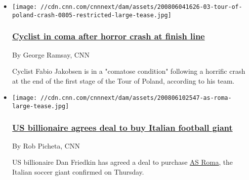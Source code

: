 \begin{itemize}
\item
  \href{/2020/08/06/sport/fabio-jakobsen-tour-of-poland-crash-cycling-spt-intl/index.html}{}

  \texttt{[image: //cdn.cnn.com/cnnnext/dam/assets/200806041626-03-tour-of-poland-crash-0805-restricted-large-tease.jpg]}

  \hypertarget{cyclist-in-coma-after-horror-crash-at-finish-line}{%
  \subsubsection{\texorpdfstring{\href{/2020/08/06/sport/fabio-jakobsen-tour-of-poland-crash-cycling-spt-intl/index.html}{Cyclist
  in coma after horror crash at finish
  line}}{Cyclist in coma after horror crash at finish line}}\label{cyclist-in-coma-after-horror-crash-at-finish-line}}

  By George Ramsay, CNN

  Cyclist Fabio Jakobsen is in a "comatose condition" following a
  horrific crash at the end of the first stage of the Tour of Poland,
  according to his team.
\end{itemize}

\begin{itemize}
\item
  \href{/2020/08/06/football/as-roma-dan-friedkin-sale-scli-spt-intl/index.html}{}

  \texttt{[image: //cdn.cnn.com/cnnnext/dam/assets/200806102547-as-roma-large-tease.jpg]}

  \hypertarget{us-billionaire-agrees-deal-to-buy-italian-football-giant-1}{%
  \subsubsection{\texorpdfstring{\href{/2020/08/06/football/as-roma-dan-friedkin-sale-scli-spt-intl/index.html}{US
  billionaire agrees deal to buy Italian football
  giant}}{US billionaire agrees deal to buy Italian football giant}}\label{us-billionaire-agrees-deal-to-buy-italian-football-giant-1}}

  By Rob Picheta, CNN

  US billionaire Dan Friedkin has agreed a deal to purchase
  \href{https://www.cnn.com/2020/03/28/football/as-roma-care-coronavirus-packages-elderly-supporters-spt-intl/index.html}{AS
  Roma}, the Italian soccer giant confirmed on Thursday.
\end{itemize}

